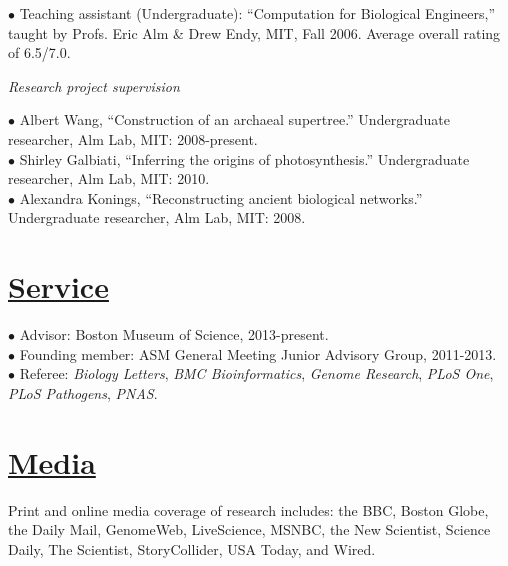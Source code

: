 \documentclass[overlapped,line,11pt]{res}
\begin{document}
\begin{resume}
\vspace{-10mm}
\hangindent=0.5in $\bullet$\hspace{.1in} Teaching assistant
(Undergraduate): ``Computation for Biological Engineers,''
taught by Profs. Eric Alm \& Drew Endy, MIT, Fall 2006.  Average overall rating
  of 6.5/7.0.

\emph{Research project supervision}

\hangindent=0.5in $\bullet$\hspace{.1in} Albert Wang, ``Construction
of an archaeal supertree.''  Undergraduate researcher, Alm Lab, MIT:
2008-present.\\

\vspace{-10mm} \hangindent=0.5in $\bullet$\hspace{.1in} Shirley
Galbiati, ``Inferring the origins of photosynthesis.''
Undergraduate researcher, Alm Lab, MIT: 2010.\\

\vspace{-10mm} 
\hangindent=0.5in $\bullet$\hspace{.1in} Alexandra
Konings, ``Reconstructing ancient
biological networks.''  Undergraduate researcher, Alm Lab, MIT: 2008.

\section{\underline{\sc Service}}
\vspace{.25in}

\hangindent=0.5in $\bullet$\hspace{.1in} Advisor: Boston Museum of Science, 2013-present. \\

\vspace{-10mm}
\hangindent=0.5in $\bullet$\hspace{.1in} Founding member: ASM General Meeting
Junior Advisory Group, 2011-2013. \\

\vspace{-10mm} \hangindent=0.5in $\bullet$\hspace{.1in} Referee:
\emph{Biology Letters}, \emph{BMC Bioinformatics}, \emph{Genome
  Research}, \emph{PLoS One}, \emph{PLoS Pathogens}, \emph{PNAS}.


\section{\underline{\sc Media}} 
\vspace{.25in} Print and online media coverage of research includes:
the BBC, Boston Globe, the Daily Mail, GenomeWeb, LiveScience, MSNBC,
the New Scientist, Science Daily, The Scientist, StoryCollider, USA Today, and Wired.


\end{resume}
\end{document}
